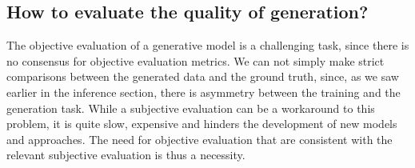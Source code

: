 \subsection{How to evaluate the quality of generation?}\label{sec:eval_metrics}
  \par The objective evaluation of a generative model is a challenging task, since there is no consensus for objective evaluation metrics. We can not simply make strict comparisons between the generated data and the ground truth, since, as we saw earlier in the inference section, there is asymmetry between the training and the generation task. While a subjective evaluation can be a workaround to this problem, it is quite slow, expensive and hinders the development of new models and approaches. The need for objective evaluation that are consistent with the relevant subjective evaluation is thus a necessity.

